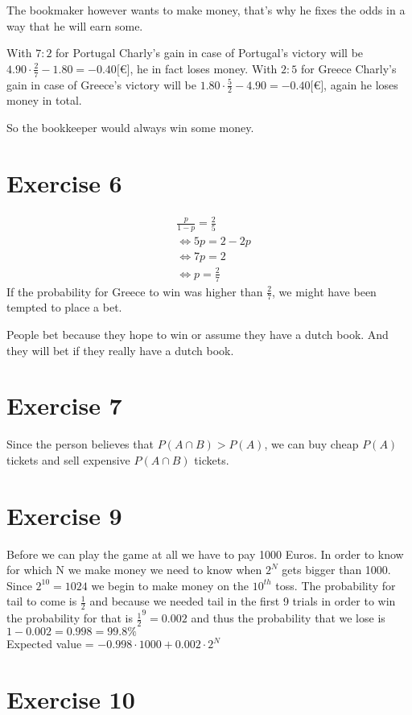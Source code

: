 The bookmaker however wants to make money, that's why he fixes the odds in a way that he will earn some.

With $7 : 2$ for Portugal Charly's gain in case of Portugal's victory will be $4.90 \cdot \frac{2}{7} - 1.80 = -0.40 {[}\euro{]}$, he in fact loses money.
With $2 : 5$ for Greece Charly's gain in case of Greece's victory will be $1.80 \cdot \frac{5}{2} - 4.90 = -0.40 {[}\euro{]}$, again he loses money in total.

So the bookkeeper would always win some money.

\section*{Exercise 6}
\begin{align*}
& \frac{p}{1-p} = \frac{2}{5}\\
& \Leftrightarrow 5p = 2 - 2p\\
& \Leftrightarrow 7p = 2\\
& \Leftrightarrow p = \frac{2}{7}
\end{align*}
If the probability for Greece to win was higher than $\frac{2}{7}$, we might have been tempted to place a bet.

People bet because they hope to win or assume they have a dutch book. And they will bet if they really have a dutch book.

\section*{Exercise 7}
Since the person believes that $P(A\cap B)>P(A)$, we can buy cheap $P(A)$ tickets and sell expensive $P(A\cap B)$ tickets.


\section*{Exercise 9}
Before we can play the game at all we have to pay 1000 Euros. In order to know for which N we make money we need to know when $2^{N}$ gets bigger than 1000. Since $2^{10} = 1024$ we begin to make money on the $10^{th}$ toss.
The probability for tail to come is $\frac{1}{2}$ and because we needed tail in the first 9 trials in order to win the probability for that is $\frac{1}{2}^{9} = 0.002$ and thus the probability that we lose is $1-0.002 = 0.998 = 99.8\%$ \\
Expected value = $-0.998\cdot 1000 + 0.002\cdot 2^{N}$ 

\section*{Exercise 10}


